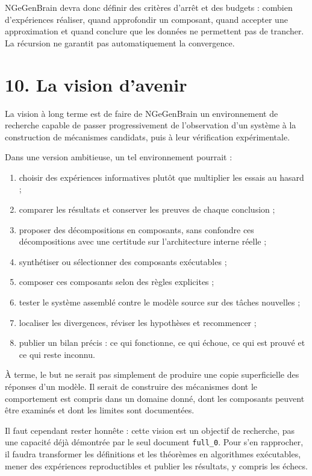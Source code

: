 \documentclass[11pt,a4paper]{article}
\begin{document}
NGeGenBrain devra donc définir des critères d'arrêt et des budgets : combien d'expériences réaliser, quand approfondir un composant, quand accepter une approximation et quand conclure que les données ne permettent pas de trancher. La récursion ne garantit pas automatiquement la convergence.

\section*{10. La vision d'avenir}

La vision à long terme est de faire de NGeGenBrain un environnement de recherche capable de passer progressivement de l'observation d'un système à la construction de mécanismes candidats, puis à leur vérification expérimentale.

Dans une version ambitieuse, un tel environnement pourrait :
\begin{enumerate}[leftmargin=1.6em]
  \item choisir des expériences informatives plutôt que multiplier les essais au hasard ;
  \item comparer les résultats et conserver les preuves de chaque conclusion ;
  \item proposer des décompositions en composants, sans confondre ces décompositions avec une certitude sur l'architecture interne réelle ;
  \item synthétiser ou sélectionner des composants exécutables ;
  \item composer ces composants selon des règles explicites ;
  \item tester le système assemblé contre le modèle source sur des tâches nouvelles ;
  \item localiser les divergences, réviser les hypothèses et recommencer ;
  \item publier un bilan précis : ce qui fonctionne, ce qui échoue, ce qui est prouvé et ce qui reste inconnu.
\end{enumerate}

À terme, le but ne serait pas simplement de produire une copie superficielle des réponses d'un modèle. Il serait de construire des mécanismes dont le comportement est compris dans un domaine donné, dont les composants peuvent être examinés et dont les limites sont documentées.

Il faut cependant rester honnête : cette vision est un objectif de recherche, pas une capacité déjà démontrée par le seul document \texttt{full\_0}. Pour s'en rapprocher, il faudra transformer les définitions et les théorèmes en algorithmes exécutables, mener des expériences reproductibles et publier les résultats, y compris les échecs.
\end{document}
